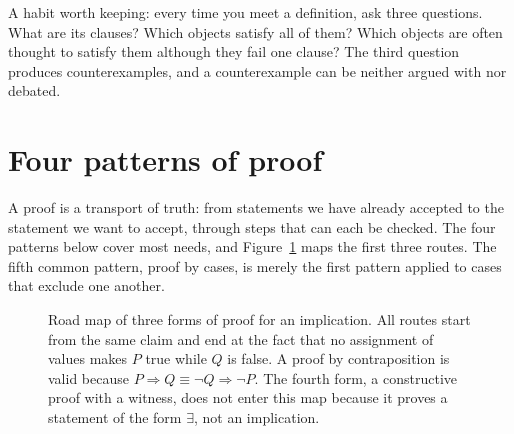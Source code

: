 A habit worth keeping: every time you meet a
definition, ask three questions. What are its clauses? Which objects satisfy
all of them? Which objects are often thought to satisfy them although they fail one clause?
The third question produces counterexamples, and a counterexample can be neither
argued with nor debated.

\section{Four patterns of proof}

A proof is a transport of truth: from statements we have already accepted to the
statement we want to accept, through steps that can each be checked.
The four patterns below cover most needs, and
Figure~\ref{fig:peta-tiga-bukti} maps the first three routes. The fifth common pattern,
proof by cases, is merely the first pattern applied to cases that exclude one another.

\begin{figure}[htbp]
\centering
{}
\caption{Road map of three forms of proof for an implication. All routes start from the same claim
and end at the fact that no assignment of values makes $P$ true while
$Q$ is false. A proof by contraposition is valid because $P \Rightarrow Q \equiv \neg Q \Rightarrow \neg P$.
The fourth form, a constructive proof with a witness, does not enter this map because it proves
a statement of the form $\exists$, not an implication.}
\label{fig:peta-tiga-bukti}
\end{figure}

